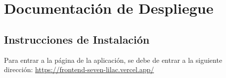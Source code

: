 	\chapter{Documentación de Despliegue}
	
	\section{Instrucciones de Instalación}
	Para entrar a la página de la aplicación, se debe de entrar a la siguiente dirección: \href{https://frontend-seven-lilac.vercel.app/}{https://frontend-seven-lilac.vercel.app/}
	
